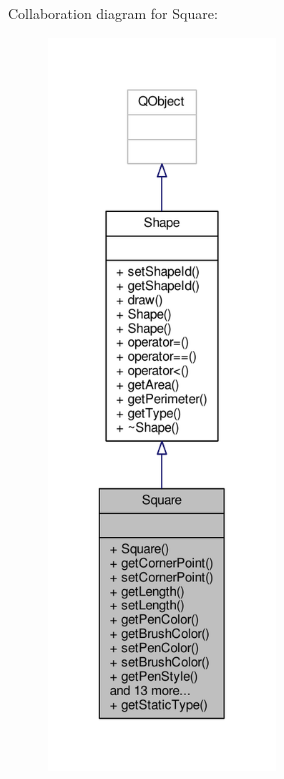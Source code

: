 Collaboration diagram for Square\+:\nopagebreak
\begin{figure}[H]
\begin{center}
\leavevmode
\includegraphics[height=550pt]{classSquare__coll__graph}
\end{center}
\end{figure}
